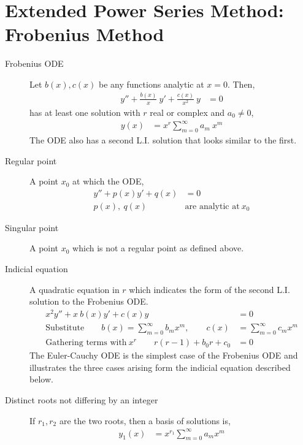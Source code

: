 \section{Extended Power Series Method: Frobenius Method}
\begin{description}
    \item[Frobenius ODE] Let $ b(x), c(x) $ be any functions analytic at $ x = 0 $. Then,
        \begin{align}
            y'' + \frac{b(x)}{x}\ y' + \frac{c(x)}{x^2}\ y & = 0
        \end{align}
        has at least one solution with $ r $ real or complex and $ a_0 \neq 0 $,
        \begin{align}
            y(x) & = x^r \sum_{m = 0}^{\infty}a_m\ x^m
        \end{align}
        The ODE also has a second L.I. solution that looks similar to the first.
    \item[Regular point] A point $ x_0 $ at which the ODE,
        \begin{align}
            y'' + p(x)y' + q(x) & = 0                         \\
            p(x),\ q(x)\        & \text{are analytic at}\ x_0
        \end{align}
    \item[Singular point] A point $ x_0 $ which is not a regular point as defined
        above.
    \item[Indicial equation] A quadratic equation in $ r $ which indicates the
        form of the second L.I. solution to the Frobenius ODE.
        \begin{align}
            x^2 y'' + x\ b(x)y' + c(x)y & = 0                           \\
            \text{Substitute}\qquad b(x) = \sum_{m=0}^{\infty} b_m x^m,
            \qquad c(x)                 & = \sum_{m=0}^{\infty} c_m x^m \\
            \text{Gathering terms with}\ x^r
            \qquad r(r-1) + b_0 r + c_0 & = 0
        \end{align}
        The Euler-Cauchy ODE is the simplest case of the Frobenius ODE and illustrates
        the three cases arising form the indicial equation described below.
    \item[Distinct roots not differing by an integer] If $ r_1, r_2 $ are the two roots,
        then a basis of solutions is,
        \begin{align}
            y_1(x) & = x^{r_1} \sum_{m=0}^{\infty}a_m x^m \\

\end{align}
\end{description}
